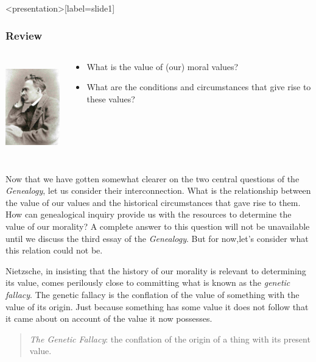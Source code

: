 \begin{frame}<presentation>[label=slide1]
    \frametitle{Review}
        \begin{columns}
            \begin{column}{3cm}
                \includegraphics[height=4cm]{../../graphics/nietzsche.jpg}
            \end{column}
            \begin{column}{7cm}
                \begin{itemize}
                    \item What is the value of (our) moral values?
                    \item What are the conditions and circumstances that give rise to these values?
                \end{itemize}
            \end{column}
        \end{columns}
\end{frame}

Now that we have gotten somewhat clearer on the two central questions of the \emph{Genealogy}, let us consider their interconnection. What is the relationship between the value of our values and the historical circumstances that gave rise to them. How can genealogical inquiry provide us with the resources to determine the value of our morality? A complete answer to this question will not be unavailable until we discuss the third essay of the \emph{Genealogy}. But for now,let's consider what this relation could not be.

Nietzsche, in insisting that the history of our morality is relevant to determining its value, comes perilously close to committing what is known as the \emph{genetic fallacy}. The genetic fallacy is the conflation of the value of something with the value of its origin. Just because something has some value it does not follow that it came about on account of the value it now possesses. 
\begin{quote}
	\emph{The Genetic Fallacy}: the conflation of the origin of a thing with its present value.
\end{quote}


